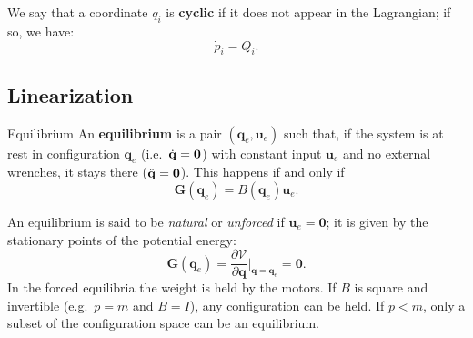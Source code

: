 \documentclass[10pt, a4paper]{report}
\newcommand{\q}{{\mathbf q}}
\begin{document}
\noindent We say that a coordinate $q_i$ is \textbf{cyclic} if it does not appear in the Lagrangian; if so, we have:\begin{equation}
     \dot p_i=Q_i.
\end{equation}
\subsection{Linearization}
\begin{boxdefinition}{Equilibrium}{}
    An \textbf{equilibrium} is a pair $(\q_e,\mathbf u_e)$ such that, if the system is at rest in configuration $\q_e$ (i.e.\ ${\dot{\mathbf q}}=\mathbf 0$) with constant input $\mathbf u_e$ and no external wrenches, it stays there (${\ddot{\mathbf q}}=\mathbf 0$). This happens if and only if\begin{equation}
        \mathbf G(\q_e)=B(\q_e)\mathbf u_e.
    \end{equation}
\end{boxdefinition}
An equilibrium is said to be \textit{natural} or \textit{unforced} if $\mathbf u_e=\mathbf 0$; it is given by the stationary points of the potential energy:\begin{equation}
    \mathbf G(\q_e)=\frac{\partial\mathcal V}{\partial \q}\Big|_{\q=\q_e}=\mathbf 0.
\end{equation}
In the forced equilibria the weight is held by the motors. If $B$ is square and invertible (e.g.\ $p=m$ and $B=I$), any configuration can be held. If $p<m$, only a subset of the configuration space can be an equilibrium.
\end{document}
